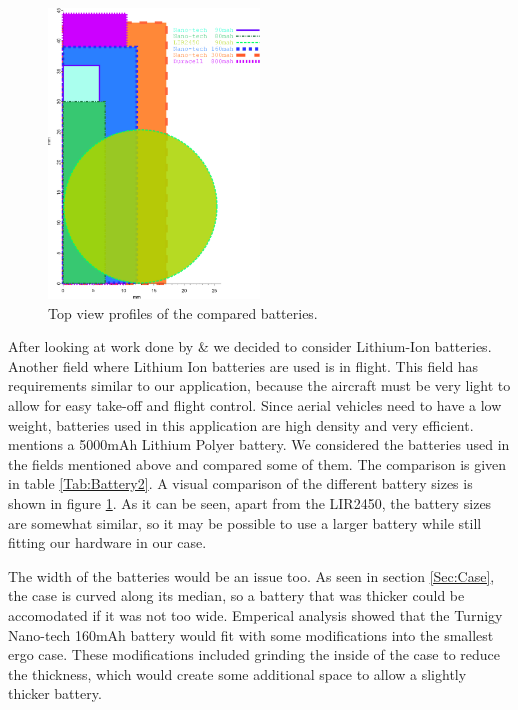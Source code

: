 \begin{figure}
\begin{center}
\includegraphics[width=0.5\textwidth]{images/battcompare.eps}
\caption{Top view profiles of the compared batteries.}
\label{Fig:BattComp}
\end{center}
\end{figure}
After looking at work done by \cite{Web:ShimmerHome} \& \cite{drennan2010assessment} we decided to consider Lithium-Ion batteries. Another field where Lithium Ion batteries are used is in flight. This field has requirements similar to our application, because the aircraft must be very light to allow for easy take-off and flight control. Since aerial vehicles need to have a low weight, batteries used in this application are high density and very efficient. \cite{neitzel2011mobile} mentions a 5000mAh Lithium Polyer battery. We considered the batteries used in the fields mentioned above and compared some of them. The comparison is given in table \ref{Tab:Battery2}. A visual comparison of the different battery sizes is shown in figure \ref{Fig:BattComp}. As it can be seen, apart from the LIR2450, the battery sizes are somewhat similar,
so it may be possible to use a larger battery while still fitting our hardware in our case.

The width of the batteries would be an issue too.
As seen in section \ref{Sec:Case},
the case is curved along its median,
so a battery that was thicker could be accomodated if it was not too wide.
Emperical analysis showed that the Turnigy Nano-tech 160mAh battery
would fit with some modifications into the smallest ergo case.
These modifications included grinding the inside of the case to reduce the thickness,
which would create some additional space to allow a slightly thicker battery.

